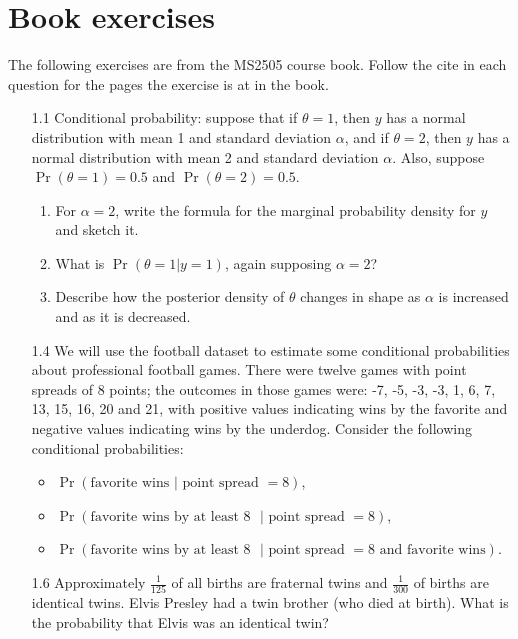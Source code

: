 \documentclass[12pt,a4paper,twoside]{article}
\begin{document}
\section{Book exercises}
The following exercises are from the MS2505 course book\cite{CourseBook}. Follow the cite in each question for the pages
the exercise is at in the book.
\begin{enumerate}
    \item[1.1] Conditional probability: suppose that if $\theta = 1$, then $y$ has a normal distribution with mean
    1 and standard deviation $\alpha$, and if $\theta = 2$, then $y$ has a normal distribution with mean 2
    and standard deviation $\alpha$. Also, suppose $\Pr(\theta = 1) = 0.5$ and $\Pr(\theta = 2) = 0.5$\cite{Chapter1Exercises}.
    \begin{enumerate}[label=$(\alph*)$]
        \item For $\alpha = 2$, write the formula for the marginal probability density for $y$ and sketch it.
        \item What is $\Pr(\theta = 1|y = 1)$, again supposing $\alpha = 2$?
        \item Describe how the posterior density of $\theta$ changes in shape as $\alpha$ is increased and as it is
        decreased.
    \end{enumerate}
    \item[1.4] We will use the football dataset to estimate some conditional probabilities about professional football
    games. There were twelve games with point spreads of 8 points; the outcomes in those games were: -7, -5, -3, -3,
    1, 6, 7, 13, 15, 16, 20 and 21, with positive values indicating wins by the favorite and negative values indicating
    wins by the underdog. Consider the following conditional probabilities\cite{Chapter1Exercises}:
    \begin{itemize}
        \item $\Pr(\text{favorite wins }|\text{ point spread }= 8)$,
        \item $\Pr(\text{favorite wins by at least }8\text{ }|\text{ point spread }= 8)$,
        \item $\Pr(\text{favorite wins by at least }8\text{ }| \text{ point spread } = 8\text{ and favorite wins})$.
    \end{itemize} 
    \item[1.6] Approximately $\frac{1}{125}$ of all births are fraternal twins and $\frac{1}{300}$ of births are identical twins.
    Elvis Presley had a twin brother (who died at birth). What is the probability that Elvis was an identical twin?

\end{enumerate}
\end{document}
